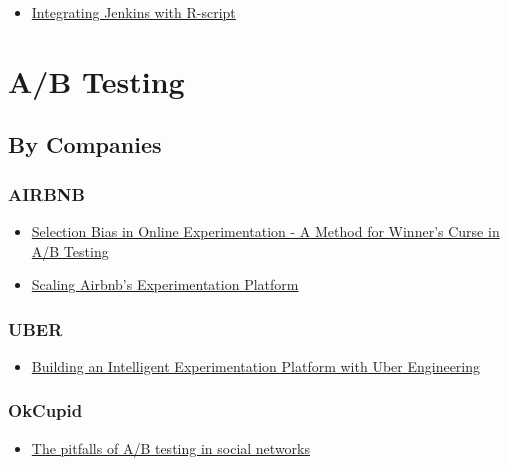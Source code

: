 \documentclass[]{book}
\providecommand{\tightlist}{%
  \setlength{\itemsep}{0pt}\setlength{\parskip}{0pt}}
\theoremstyle{definition}
\theoremstyle{definition}
\theoremstyle{definition}
\theoremstyle{remark}
\begin{document}
\begin{itemize}
\tightlist
\item
  \href{http://biouno.org/tutorials/tutorial01-jenkins-rscript.html}{Integrating
  Jenkins with R-script}
\end{itemize}

\chapter{A/B Testing}\label{ab-testing}

\section{By Companies}\label{by-companies}

\subsection{AIRBNB}\label{airbnb}

\begin{itemize}
\item
  \href{https://medium.com/airbnb-engineering/selection-bias-in-online-experimentation-c3d67795cceb}{Selection
  Bias in Online Experimentation - A Method for Winner's Curse in A/B
  Testing}
\item
  \href{https://medium.com/airbnb-engineering/https-medium-com-jonathan-parks-scaling-erf-23fd17c91166}{Scaling
  Airbnb's Experimentation Platform}
\end{itemize}

\subsection{UBER}\label{uber}

\begin{itemize}
\tightlist
\item
  \href{https://eng.uber.com/experimentation-platform/}{Building an
  Intelligent Experimentation Platform with Uber Engineering}
\end{itemize}

\subsection{OkCupid}\label{okcupid}

\begin{itemize}
\tightlist
\item
  \href{https://tech.okcupid.com/the-pitfalls-of-a-b-testing-in-social-networks/}{The
  pitfalls of A/B testing in social networks}
\end{itemize}
\end{document}
